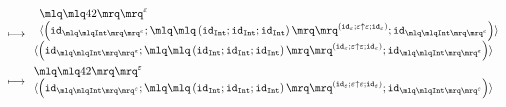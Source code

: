 \documentclass{article}
\begin{document}
\begin{align*}
\longmapsto &\;\begin{array}{l}\begin{array}{l}\quot{42}^{\varepsilon}\\\langle\left(\mathtt{id}_{\quot{\mathtt{Int}}^{\varepsilon}};\quot{\left(\mathtt{id}_{\mathtt{Int}};\mathtt{id}_{\mathtt{Int}};\mathtt{id}_{\mathtt{Int}}\right)}^{\left(\mathtt{id}_{\varepsilon};\varepsilon \uparrow \varepsilon;\mathtt{id}_{\varepsilon}\right)};\mathtt{id}_{\quot{\mathtt{Int}}^{\varepsilon}}\right)\rangle\end{array}\\\langle\left(\mathtt{id}_{\quot{\mathtt{Int}}^{\varepsilon}};\quot{\left(\mathtt{id}_{\mathtt{Int}};\mathtt{id}_{\mathtt{Int}};\mathtt{id}_{\mathtt{Int}}\right)}^{\left(\mathtt{id}_{\varepsilon};\varepsilon \uparrow \varepsilon;\mathtt{id}_{\varepsilon}\right)};\mathtt{id}_{\quot{\mathtt{Int}}^{\varepsilon}}\right)\rangle\end{array}\\ 
\longmapsto &\;\begin{array}{l}\quot{42}^{\varepsilon}\\\langle\left(\mathtt{id}_{\quot{\mathtt{Int}}^{\varepsilon}};\quot{\left(\mathtt{id}_{\mathtt{Int}};\mathtt{id}_{\mathtt{Int}};\mathtt{id}_{\mathtt{Int}}\right)}^{\left(\mathtt{id}_{\varepsilon};\varepsilon \uparrow \varepsilon;\mathtt{id}_{\varepsilon}\right)};\mathtt{id}_{\quot{\mathtt{Int}}^{\varepsilon}}\right)\rangle\end{array}\\ 
\end{align*}
\end{document}
